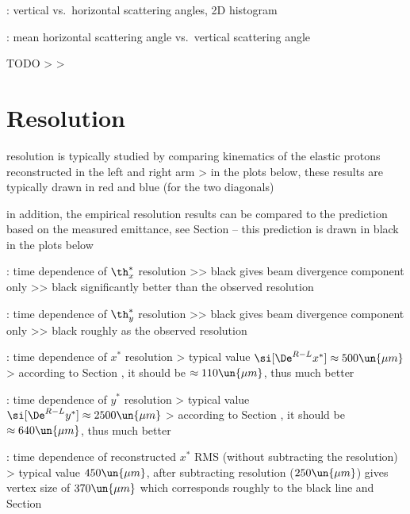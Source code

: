 \> : vertical vs.~horizontal scattering angles, 2D histogram

\> : mean horizontal scattering angle vs.~vertical scattering angle

\> TODO
\>> 
\>> 



\chapter[resolution]{Resolution}

\> resolution is typically studied by comparing kinematics of the elastic protons reconstructed in the left and right arm
\>> in the plots below, these results are typically drawn in red and blue (for the two diagonals)

\> in addition, the empirical resolution results can be compared to the prediction based on the measured emittance, see Section  -- this prediction is drawn in black in the plots below

\> : time dependence of $\th^*_x$ resolution
\>>> black gives beam divergence component only
\>>> black significantly better than the observed resolution

\> : time dependence of $\th^*_y$ resolution
\>>> black gives beam divergence component only
\>>> black roughly as the observed resolution

\> : time dependence of $x^*$ resolution
\>> typical value $\si[\De^{R-L} x^*] \approx 500\un{\mu m}$
\>> according to Section , it should be $\approx 110\un{\mu m}$, thus much better

\> : time dependence of $y^*$ resolution
\>> typical value $\si[\De^{R-L} y^*] \approx 2500\un{\mu m}$
\>> according to Section , it should be $\approx 640\un{\mu m}$, thus much better

\> : time dependence of reconstructed $x^*$ RMS (without subtracting the resolution)
\>> typical value $450\un{\mu m}$, after subtracting resolution ($250\un{\mu m}$) gives vertex size of $370\un{\mu m}$ which corresponds roughly to the black line and Section 

